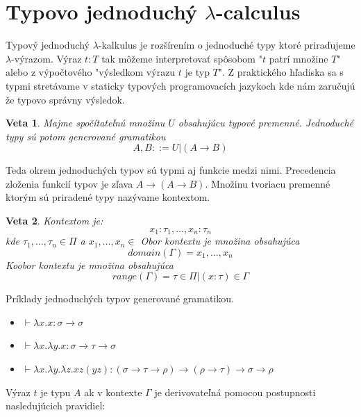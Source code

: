 \documentclass[a4paper,10pt,oneside]{report}%
\newtheorem{theorem}{Veta}[chapter]
\begin{document}
\section{Typovo jednoduchý $\lambda$-calculus}
    Typový jednoduchý $\lambda$-kalkulus je rozšírením o jednoduché typy ktoré
priraďujeme $\lambda$-výrazom.
    Výraz $t : T$ tak môžeme interpretovať spôsobom "$t$ patrí množine $T$" alebo
z výpočtového "výsledkom výrazu $t$ je typ $T$". Z praktického hľadiska sa s typmi
stretávame v staticky typových programovacích jazykoch kde nám zaručujú že typovo
správny výsledok.
\begin{theorem}
    Majme spočítateľnú množinu $U$ obsahujúcu typové premenné. Jednoduché typy
    sú potom generované gramatikou
    \begin{equation*}
        A,B ::= U | (A \to B)
    \end{equation*}
\end{theorem}
    Teda okrem jednoduchých typov sú typmi aj funkcie medzi nimi.
    Precedencia zloženia funkcií typov je zľava $A \to ( A  \to B )$. 
    Množinu tvoriacu premenné ktorým sú priradené typy nazývame kontextom.
\begin{theorem}
    Kontextom je:
    \begin{equation*}
        { x_{1} : \tau_{1}, \dots, x_{n} : \tau_{n} }
    \end{equation*}
    kde $\tau_{1}, \dots, \tau_{n} \in \Pi$ a $x_{1}, \dots , x_{n} \in$
    Obor kontextu je množina obsahujúca
    \begin{equation*}
        domain(\Gamma) = { x_{1}, \dots, x_{n} }
    \end{equation*}
    Koobor kontextu je množina obsahujúca
    \begin{equation*}
        range( \Gamma ) = { \tau \in \Pi  | (x : \tau ) \in \Gamma }
    \end{equation*}
\end{theorem}
    Príklady jednoduchých typov generované gramatikou.
\begin{itemize}
    \item $\vdash \lambda x.x : \sigma \to \sigma$
    \item $\vdash \lambda x. \lambda y.x : \sigma \to \tau \to \sigma$
    \item $\vdash \lambda x. \lambda y. \lambda z.x z (y z): (\sigma \to \tau \to \rho) \to (\rho \to \tau) \to \sigma \to \rho$
\end{itemize}

    Výraz $t$ je typu $A$ ak v kontexte $\Gamma$ je derivovateľná pomocou
postupnosti nasledujúcich pravidiel:
\end{document}
